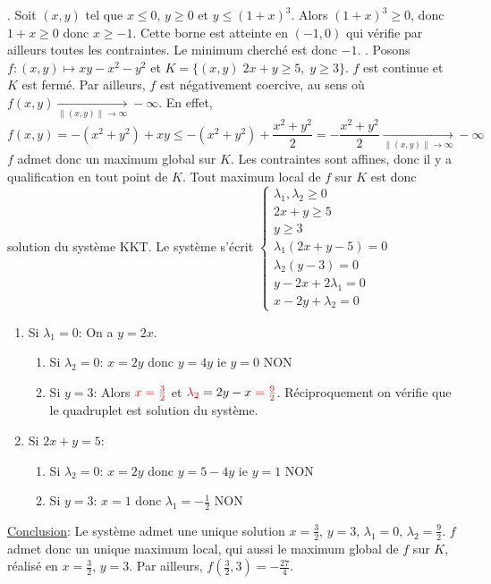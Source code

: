 \documentclass{report}
\begin{document}
. Soit $(x,y)$ tel que $x\leq 0$, $y\geq 0$ et $y\leq (1+x)^3$. Alors $(1+x)^3\geq 0$, donc $1+x\geq 0$ donc $x\geq -1$. Cette borne est atteinte en $(-1,0)$ qui vérifie par ailleurs toutes les contraintes. Le minimum cherché est donc $-1$. \newline
{}. Posons $f:(x,y)\mapsto xy-x^2-y^2$ et $K=\{(x,y)\; 2x+y\geq 5, \; y\geq 3\}$. \newline
$f$ est continue et $K$ est fermé. Par ailleurs, $f$ est négativement coercive, au sens où $f(x,y)\xrightarrow[\|(x,y)\|\to \infty ]{} -\infty$. En effet, $$f(x,y)=-(x^2+y^2) + xy \leq -(x^2+y^2) + \frac{x^2+y^2}{2} = -\frac{x^2+y^2}{2}\xrightarrow[\|(x,y)\|\to \infty ]{} -\infty$$
$f$ admet donc un maximum global sur $K$.\newline
\newline
Les contraintes sont affines, donc il y a qualification en tout point de $K$. Tout maximum local de $f$ sur $K$ est donc solution du système KKT.\newline
Le système s'écrit $\begin{cases}
\lambda_1, \lambda_2 \geq 0 \\
2x+y\geq 5 \\
y\geq 3 \\
\lambda_1(2x+y-5)=0 \\
\lambda_2(y-3)=0 \\
y-2x+2\lambda_1 =0 \\
x-2y+\lambda_2=0
\end{cases}$\newline
\begin{enumerate}
\item Si $\lambda_1=0$:\newline
On a $y=2x$.
\begin{enumerate}
\item Si $\lambda_2=0$:\newline
$x=2y$ donc $y=4y$ ie $y=0$ NON
\item Si $y=3$:\newline
Alors $\color{red}{x=\frac 32}$ et $\textcolor{red}{\lambda_2}=2y-x\;\textcolor{red}{=\frac 92}$. Réciproquement on vérifie que le quadruplet est solution du système.
\end{enumerate}
\item Si $2x+y=5$:
\begin{enumerate}
\item Si $\lambda_2=0$:\newline
$x=2y$ donc $y=5-4y$ ie $y=1$ NON
\item Si $y=3$:\newline
$x=1$ donc $\lambda_1=-\frac 12$ NON
\end{enumerate}
\end{enumerate}
\underline{Conclusion}: Le système admet une unique solution $x=\frac 32$, $y=3$, $\lambda_1=0$, $\lambda_2=\frac 92$. $f$ admet donc un unique maximum local, qui aussi le maximum global de $f$ sur $K$, réalisé en $x=\frac 32$, $y=3$. Par ailleurs, $f(\frac 32, 3)=-\frac{27}4$.
\end{document}
